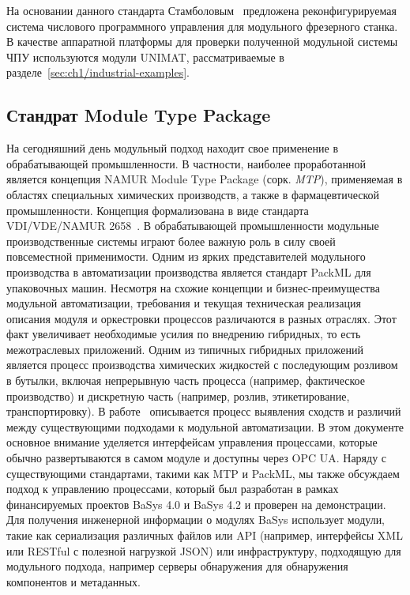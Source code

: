 На основании данного стандарта Стамболовым~\cite{stambolov2013development} предложена реконфигурируемая система числового программного управления для модульного фрезерного станка. В качестве аппаратной платформы для проверки полученной модульной системы ЧПУ используются модули UNIMAT, рассматриваемые в разделе~\cref{sec:ch1/industrial-examples}. 

\subsection{Стандрат Module Type Package}

На сегодняшний день модульный подход находит свое применение в обрабатывающей промышленности. В частности, наиболее проработанной является концепция NAMUR Module Type Package (сорк. \textit{MTP}), применяемая в областях специальных химических производств, а также в фармацевтической промышленности. Концепция формализована в виде стандарта VDI/VDE/NAMUR 2658~\cite{bernshausen2016namur}. В обрабатывающей промышленности модульные производственные системы играют более важную роль в силу своей повсеместной применимости. Одним из ярких представителей модульного производства в автоматизации производства является стандарт PackML для упаковочных машин. Несмотря на схожие концепции и бизнес-преимущества модульной автоматизации, требования и текущая техническая реализация описания модуля и оркестровки процессов различаются в разных отраслях. Этот факт увеличивает необходимые усилия по внедрению гибридных, то есть межотраслевых приложений. Одним из типичных гибридных приложений является процесс производства химических жидкостей с последующим розливом в бутылки, включая непрерывную часть процесса (например, фактическое производство) и дискретную часть (например, розлив, этикетирование, транспортировку). В работе~\cite{grothoff2020mapping} описывается процесс выявления сходств и различий между существующими подходами к модульной автоматизации. В этом документе основное внимание уделяется интерфейсам управления процессами, которые обычно развертываются в самом модуле и доступны через OPC UA. Наряду с существующими стандартами, такими как MTP и PackML, мы также обсуждаем подход к управлению процессами, который был разработан в рамках финансируемых проектов BaSys 4.0 и BaSys 4.2 и проверен на демонстрации. Для получения инженерной информации о модулях BaSys использует модули, такие как сериализация различных файлов или API (например, интерфейсы XML или RESTful с полезной нагрузкой JSON) или инфраструктуру, подходящую для модульного подхода, например серверы обнаружения для обнаружения компонентов и метаданных.

